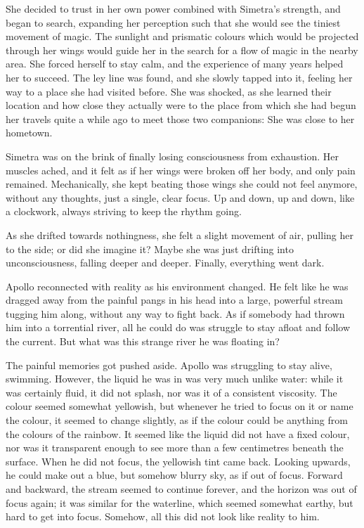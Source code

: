 She decided to trust in her own power combined with Simetra's strength, and began to search, expanding her perception such that she would see the tiniest movement of magic. The sunlight and prismatic colours which would be projected through her wings would guide her in the search for a flow of magic in the nearby area. She forced herself to stay calm, and the experience of many years helped her to succeed. The ley line was found, and she slowly tapped into it, feeling her way to a place she had visited before. She was shocked, as she learned their location and how close they actually were to the place from which she had begun her travels quite a while ago to meet those two companions: She was close to her hometown.

\froufrou{}

Simetra was on the brink of finally losing consciousness from exhaustion. Her muscles ached, and it felt as if her wings were broken off her body, and only pain remained. Mechanically, she kept beating those wings she could not feel anymore, without any thoughts, just a single, clear focus. Up and down, up and down, like a clockwork, always striving to keep the rhythm going. 

As she drifted towards nothingness, she felt a slight movement of air, pulling her to the side; or did she imagine it? Maybe she was just drifting into unconsciousness, falling deeper and deeper. Finally, everything went dark.

\froufrou{}

Apollo reconnected with reality as his environment changed. He felt like he was dragged away from the painful pangs in his head into a large, powerful stream tugging him along, without any way to fight back. As if somebody had thrown him into a torrential river, all he could do was struggle to stay afloat and follow the current. But what was this strange river he was floating in?

The painful memories got pushed aside. Apollo was struggling to stay alive, swimming. However, the liquid he was in was very much unlike water: while it was certainly fluid, it did not splash, nor was it of a consistent viscosity. The colour seemed somewhat yellowish, but whenever he tried to focus on it or name the colour, it seemed to change slightly, as if the colour could be anything from the colours of the rainbow. It seemed like the liquid did not have a fixed colour, nor was it transparent enough to see more than a few centimetres beneath the surface. When he did not focus, the yellowish tint came back. Looking upwards, he could make out a blue, but somehow blurry sky, as if out of focus. Forward and backward, the stream seemed to continue forever, and the horizon was out of focus again; it was similar for the waterline, which seemed somewhat earthy, but hard to get into focus. Somehow, all this did not look like reality to him. 

